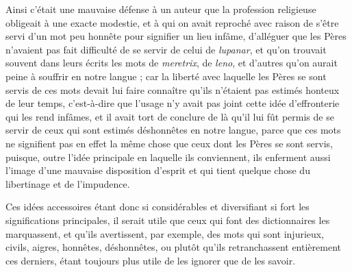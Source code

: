 Ainsi c'était une mauvaise défense à un auteur que la profession religieuse obligeait à une exacte modestie, et à qui on avait reproché avec raison de s'être servi d'un mot peu honnête pour signifier un lieu infâme, d'alléguer que les Pères n'avaient pas fait difficulté de se servir de celui de \emph{lupanar}, et qu'on trouvait souvent dans leurs écrits les mots de \emph{meretrix}, de \emph{leno}, et d'autres qu'on aurait peine à souffrir en notre langue ; car la liberté avec laquelle les Pères se sont servis de ces mots devait lui faire connaître qu'ils n'étaient pas estimés honteux de leur temps, c'est-à-dire que l'usage n'y avait pas joint cette idée d'effronterie qui les rend infâmes, et il avait tort de conclure de là qu'il lui fût permis de se servir de ceux qui sont estimés déshonnêtes en notre langue, parce que ces mots ne signifient pas en effet la même chose que ceux dont les Pères se sont servis, puisque, outre l'idée principale en laquelle ils conviennent, ils enferment aussi l'image d'une mauvaise disposition d'esprit et qui tient quelque chose du libertinage et de l'impudence.

Ces idées accessoires étant donc si considérables et diversifiant si fort les significations principales, il serait utile que ceux qui font des dictionnaires les marquassent, et qu'ils avertissent, par exemple, des mots qui sont injurieux, civils, aigres, honnêtes, déshonnêtes, ou plutôt qu'ils retranchassent entièrement ces derniers, étant toujours plus utile de les ignorer que de les savoir.
